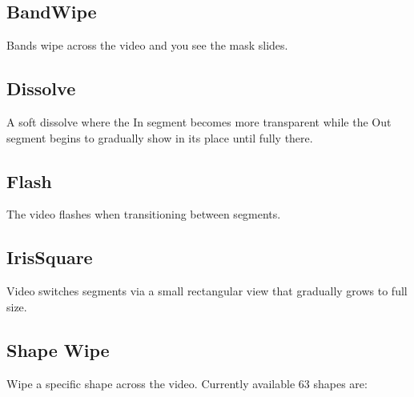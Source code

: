 \subsection*{BandWipe}%
\label{sub:bandwipe}

Bands wipe across the video and you see the mask slides.

\subsection*{Dissolve}%
\label{sub:dissolve}

A soft dissolve where the In segment becomes more transparent while the Out segment begins to gradually show in its place until fully there.

\subsection*{Flash}%
\label{sub:flash}

The video flashes when transitioning between segments.

\subsection*{IrisSquare}%
\label{sub:irissquare}

Video switches segments via a small rectangular view that gradually grows to full size.

\subsection*{Shape Wipe}%
\label{sub:shape_wipe}

Wipe a specific shape across the video. Currently available 63 shapes are:

